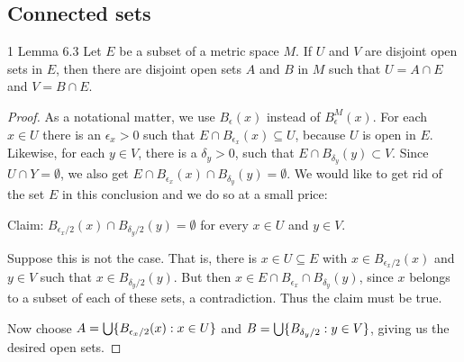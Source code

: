 \subsection{Connected sets}


\begin{exercise}{1 Lemma 6.3}
Let $E$ be a subset of a metric space $M$.
If $U$ and $V$ are disjoint open sets in $E$, then there are disjoint open sets $A$ and $B$ in $M$ such that $U=A\cap E$ and $V=B\cap E$.
\end{exercise}
\begin{proof}
As a notational matter, we use $B_\epsilon(x)$ instead of $B_\epsilon^M(x)$.
For each $x\in U$ there is an $\epsilon_x>0$ such that $E\cap B_{\epsilon_x}(x)\subseteq U$, because $U$ is open in $E$.
Likewise, for each $y\in V$, there is a $\delta_y>0$, such that $E\cap B_{\delta_y}(y)\subset V$.
Since $U\cap Y = \emptyset$, we also get $E\cap B_{\epsilon_x}(x)\cap B_{\delta_y}(y) = \emptyset$.
We would like to get rid of the set $E$ in this conclusion and we do so at a small price:

Claim: $B_{\epsilon_x/2}(x)\cap B_{\delta_y/2}(y) = \emptyset$ for every $x\in U$ and $y\in V$. 

Suppose this is not the case.
That is, there is $x\in U\subseteq E$ with $x\in B_{\epsilon_x/2}(x)$ and $y\in V$ such that $x\in B_{\delta_y/2}(y)$.
But then $x\in E \cap B_{\epsilon_x} \cap B_{\delta_y}(y)$, since $x$ belongs to a subset of each of these sets, a contradiction.
Thus the claim must be true.

Now choose $A = \bigcup \{B_{\epsilon_x/2}(x): x\in U\}$ and $B = \bigcup\{B_{\delta_y/2}: y\in V\}$, giving us the desired open sets.
\end{proof} 

